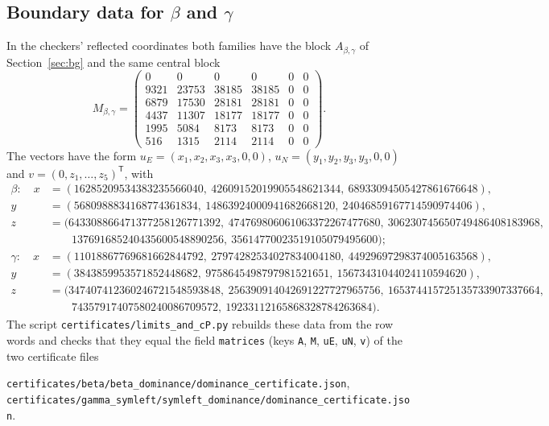 \documentclass[11pt]{amsart}
\theoremstyle{definition}
\theoremstyle{remark}
\begin{document}
\subsection*{Boundary data for $\beta$ and $\gamma$}
In the checkers' reflected coordinates both families have the block $A_{\beta,\gamma}$ of Section~\ref{sec:bg} and the same central block
\[
M_{\beta,\gamma}=\begin{pmatrix}
0&0&0&0&0&0\\ 9321&23753&38185&38185&0&0\\ 6879&17530&28181&28181&0&0\\ 4437&11307&18177&18177&0&0\\ 1995&5084&8173&8173&0&0\\ 516&1315&2114&2114&0&0
\end{pmatrix}.
\]
The vectors have the form $u_E=(x_1,x_2,x_3,x_3,0,0)$, $u_N=(y_1,y_2,y_3,y_3,0,0)$ and $v=(0,z_1,\dots,z_5)^{\mathsf T}$, with
{\footnotesize
\begin{align*}
\beta:\quad x&=(16285209534383235566040,\ 42609152019905548621344,\ 68933094505427861676648),\\
y&=(5680988834168774361834,\ 14863924000941682668120,\ 24046859167714590974406),\\
z&=(643308866471377258126771392,\ 474769806061063372267477680,\ 306230745650749486408183968,\\
&\qquad 137691685240435600548890256,\ 35614770023519105079495600);\\[2pt]
\gamma:\quad x&=(11018867769681662844792,\ 27974282534027834004180,\ 44929697298374005163568),\\
y&=(3843859953571852448682,\ 9758645498797981521651,\ 15673431044024110594620),\\
z&=(347407412360246721548593848,\ 256390914042691227727965756,\ 165374415725135733907337664,\\
&\qquad 74357917407580240086709572,\ 19233112165868328784263684).
\end{align*}}
The script \texttt{certificates/limits\_and\_cP.py} rebuilds these data from the row words and checks that they equal the field \texttt{matrices} (keys \texttt{A}, \texttt{M}, \texttt{uE}, \texttt{uN}, \texttt{v}) of the two certificate files
\begin{center}\footnotesize
\texttt{certificates/beta/beta\_dominance/dominance\_certificate.json},\\
\texttt{certificates/gamma\_symleft/symleft\_dominance/dominance\_certificate.json}.
\end{center}
\end{document}
